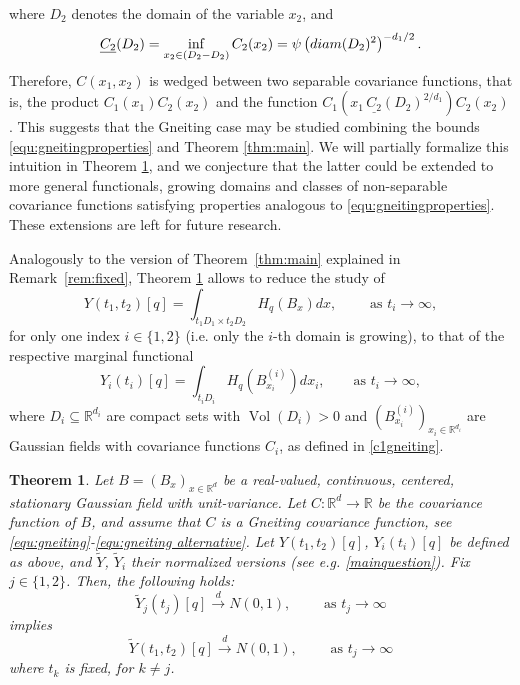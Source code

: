 \documentclass[12pt]{article}
\DeclareMathOperator{\1}{1}
\DeclareMathOperator{\vol}{Vol}
\newcommand{\R}{\mathbb{R}}
\theoremstyle{plain}
\newtheorem{theorem}{Theorem}
\theoremstyle{definition}
\begin{document}
where $D_2$ denotes the domain of the variable $x_2$, and
\begin{equation}
    \underline{C_2}(D_2)=\inf_{x_2\in (D_2-D_2)}C_2(x_2)=\psi\left({\rm diam}(D_2)^2\right)^{-d_1/2}.
\end{equation}
Therefore, $C(x_1,x_2)$ is wedged between two separable covariance functions, that is, the product $C_1(x_1)C_2(x_2)$ and the function $C_1(x_1\, \underline{C_2}(D_2)^{2/d_1})C_2(x_2)$. This suggests that the Gneiting case may  be studied combining the bounds \eqref{equ:gneitingproperties} and Theorem \ref{thm:main}. We will partially formalize this intuition in Theorem \ref{thm:gneitingcase}, and we conjecture that the latter could be extended to more general functionals, growing domains and classes of non-separable covariance functions satisfying properties analogous to \eqref{equ:gneitingproperties}. These extensions are left for future research.

Analogously to the version of Theorem~\ref{thm:main} explained in Remark~\ref{rem:fixed}, Theorem \ref{thm:gneitingcase} allows to reduce the study of 
\[
Y(t_1,t_2)[q]=\int_{t_1D_1\times t_2D_2}H_q(B_{x})dx, \quad \quad \text{ as }t_i\rightarrow\infty,
\]
for only one index $i\in\{1,2\}$ (i.e. only the $i$-th domain is growing), to that of the respective marginal functional
\[
Y_i(t_i)[q]=\int_{t_iD_i}H_q(B^{(i)}_{x_i})dx_i, \quad \quad\text{as }t_i\rightarrow\infty,
\]
where $D_i\subseteq \R^{d_i}$ are compact sets with $\vol(D_i)>0$ and $(B^{(i)}_{x_i})_{x_i\in \R^{d_i}}$ are Gaussian fields with covariance functions $C_i$, as defined in \eqref{c1gneiting}.

\begin{theorem}\label{thm:gneitingcase}
    Let $B=(B_x)_{x\in\R^d}$ be a real-valued, continuous, centered, stationary Gaussian field with unit-variance. Let $C:\R^d \rightarrow \R$ be the covariance function of $B$, and assume that $C$ is a Gneiting covariance function, see \eqref{equ:gneiting}-\eqref{equ:gneiting alternative}. Let $Y(t_1,t_2)[q]$, $Y_i(t_i)[q]$ be defined as above, and $\widetilde Y$, $\widetilde Y_i$ their normalized versions (see e.g. \eqref{mainquestion}). Fix $j\in\{1,2\}$. Then, the following holds:
    $$\widetilde{Y}_j(t_j)[q]\overset{d}{\rightarrow} N(0,1),\quad \quad \text{ as }t_j\rightarrow\infty$$ 
    implies
    $$\widetilde{Y}(t_1,t_2)[q]\overset{d}{\rightarrow} N(0,1), \quad \quad \text{ as }t_j\rightarrow\infty$$
    where $t_k$ is fixed, for $k\neq j$.
\end{theorem}
\end{document}
